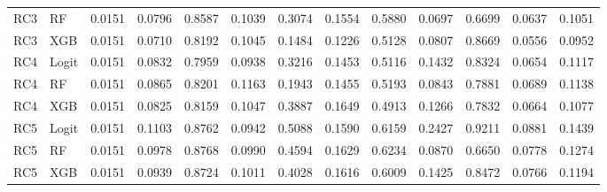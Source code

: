 \documentclass[11pt,a4paper]{article}
\begin{document}
\begin{landscape}
\begin{table}[htbp]
{\begin{tabular}{llrrrrrrrrrrr}
RC3 & RF & 0.0151 & 0.0796 & 0.8587 & 0.1039 & 0.3074 & 0.1554 & 0.5880 & 0.0697 & 0.6699 & 0.0637 & 0.1051 \\
RC3 & XGB & 0.0151 & 0.0710 & 0.8192 & 0.1045 & 0.1484 & 0.1226 & 0.5128 & 0.0807 & 0.8669 & 0.0556 & 0.0952 \\
RC4 & Logit & 0.0151 & 0.0832 & 0.7959 & 0.0938 & 0.3216 & 0.1453 & 0.5116 & 0.1432 & 0.8324 & 0.0654 & 0.1117 \\
RC4 & RF & 0.0151 & 0.0865 & 0.8201 & 0.1163 & 0.1943 & 0.1455 & 0.5193 & 0.0843 & 0.7881 & 0.0689 & 0.1138 \\
RC4 & XGB & 0.0151 & 0.0825 & 0.8159 & 0.1047 & 0.3887 & 0.1649 & 0.4913 & 0.1266 & 0.7832 & 0.0664 & 0.1077 \\
RC5 & Logit & 0.0151 & 0.1103 & 0.8762 & 0.0942 & 0.5088 & 0.1590 & 0.6159 & 0.2427 & 0.9211 & 0.0881 & 0.1439 \\
RC5 & RF & 0.0151 & 0.0978 & 0.8768 & 0.0990 & 0.4594 & 0.1629 & 0.6234 & 0.0870 & 0.6650 & 0.0778 & 0.1274 \\
RC5 & XGB & 0.0151 & 0.0939 & 0.8724 & 0.1011 & 0.4028 & 0.1616 & 0.6009 & 0.1425 & 0.8472 & 0.0766 & 0.1194 \\
\bottomrule
\end{tabular}%
}
\endgroup
\end{table}
\end{landscape}
\end{document}
